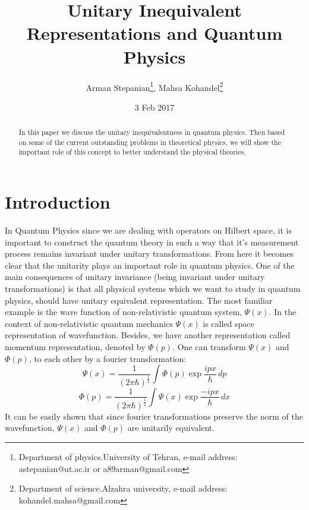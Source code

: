 \documentclass[12pt]{article}
\begin{document}
\date{3 Feb 2017}
\title{Unitary Inequivalent Representations and Quantum Physics}
\author{Arman Stepanian\thanks{ Department of physics.University of Tehran, e-mail address: astepanian@ut.ac.ir or a89arman@gmail.com}, Mahsa Kohandel\thanks{ Department of science.Alzahra university, 
e-mail address: kohandel.mahsa@gmail.com}
}

\maketitle
\begin{abstract}
In this paper we discuss the unitary inequivalentness in quantum physics. Then based on some of the current outstanding problems in theoretical physics, we will show the important role of this concept to better understand the physical theories. 
\end{abstract}
\section{Introduction}\label{section.intro}
In Quantum Physics since we are dealing with operators on Hilbert space, it is important to construct the quantum theory in such a way that it's measurement process remains invariant under unitary transformations. From here it becomes clear that the unitarity plays an important role in quantum physics. One of the main consequences of unitary invariance (being invariant under unitary transformations) is that all physical systems which we want to study in quantum physics, should have unitary equivalent representation. The most familiar example is the wave function of non-relativistic quantum system, $\Psi(x)$. In the context of non-relativistic quantum mechanics $\Psi(x)$ is called space representation of wavefunction. Besides, we have another representation called momentum representation, denoted by $\Phi(p)$. One can transform $\Psi(x)$ and $\Phi(p)$, to each other by a fourier transformation:
\begin{equation}\label{eqn.fourier trans.1}
   \Psi(x)= \frac{1}{(2\pi\hbar)^\frac{1}{2}}\int \Phi (p)\exp \frac{ipx}{\hbar}\,dp
\end{equation}
$$
      \Phi(p)=\frac{1}{(2\pi\hbar)^\frac{1}{2}}\int \Psi(x) \exp \frac{-ipx}{\hbar}\,dx
$$
It can be easily shown that since fourier transformations preserve the norm of the wavefunction, $\Psi(x)$ and $\Phi(p)$ are unitarily equivalent.
\end{document}
